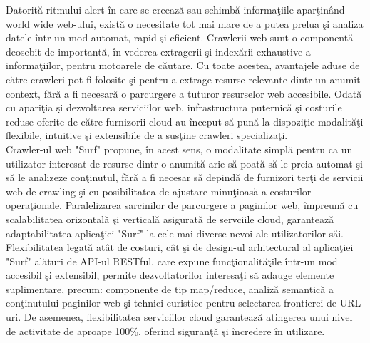 Datorită ritmului alert în care se creează sau schimbă informaţiile aparţinând world wide web-ului, există o necesitate tot mai mare de a putea prelua şi analiza datele într-un mod automat, rapid şi eficient. Crawlerii web sunt o componentă deosebit de importantă, în vederea extragerii şi indexării exhaustive a informaţiilor, pentru motoarele de căutare. Cu toate acestea, avantajele aduse de către crawleri pot fi folosite şi pentru a extrage resurse relevante dintr-un anumit context, fără a fi necesară o parcurgere a tuturor resurselor web accesibile. Odată cu apariţia şi dezvoltarea serviciilor web, infrastructura puternică şi costurile reduse oferite de către furnizorii cloud au început să pună la dispoziție modalităţi flexibile, intuitive şi extensibile de a susţine crawleri specializaţi. 
\\

\noindent
Crawler-ul web "Surf" propune, în acest sens, o modalitate simplă pentru ca un utilizator interesat de resurse dintr-o anumită arie să poată să le preia automat şi să le analizeze conţinutul, fără a fi necesar să depindă de furnizori terţi de servicii web de crawling şi cu posibilitatea de ajustare minuţioasă a costurilor operaţionale. Paralelizarea sarcinilor de parcurgere a paginilor web, împreună cu scalabilitatea orizontală şi verticală asigurată de servciile cloud, garantează adaptabilitatea aplicaţiei "Surf" la cele mai diverse nevoi ale utilizatorilor săi. Flexibilitatea legată atât de costuri, cât şi de design-ul arhitectural al aplicaţiei "Surf" alături de API-ul RESTful, care expune funcţionalităţile într-un mod accesibil şi extensibil, permite dezvoltatorilor interesaţi să adauge elemente suplimentare, precum: componente de tip map/reduce, analiză semantică a conţinutului paginilor web şi tehnici euristice pentru selectarea frontierei de URL-uri. De asemenea, flexibilitatea serviciilor cloud garantează atingerea unui nivel de activitate de aproape 100\%, oferind siguranţă şi încredere în utilizare.